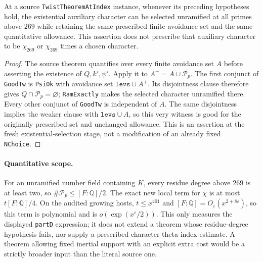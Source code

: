 \begin{proposition}
\label{AC-G40-avoidance}
At a source \texttt{TwistTheoremAtIndex} instance,
whenever its preceding hypotheses hold, the
existential auxiliary character can be selected
unramified at all primes above $269$ while retaining
the same prescribed finite avoidance set and the
same quantitative allowance.  This assertion
does not prescribe that auxiliary character to
be $\chi_{269}$ or $\chi_{269}$ times a chosen character.
\end{proposition}
\begin{proof}
The source theorem quantifies over every finite
avoidance set $A$ before asserting the existence
of $Q,k',\psi'$.  Apply it to
$A^+=A\cup\mathcal P_p$.  The first conjunct of
\texttt{GoodTw} is \texttt{PsiOk} with avoidance set
$\texttt{levs}\cup A^+$.  Its disjointness clause
therefore gives $Q\cap\mathcal P_p=\varnothing$;
\texttt{RamExactly} makes the selected character
unramified there.  Every other conjunct of
\texttt{GoodTw} is independent of $A$.
The same disjointness implies the weaker clause
with $\texttt{levs}\cup A$, so this very witness
is good for the originally prescribed set and
unchanged allowance.  This is an assertion at
the fresh existential-selection stage, not a
modification of an already fixed \texttt{NChoice}.
\end{proof}

\paragraph{Quantitative scope.}
For an unramified number field containing $K$,
every residue degree above $269$ is at least two,
so $\#\mathcal P_p\leq[F:\mathbb Q]/2$.
The exact new local term for $\chi$ is at most
$t[F:\mathbb Q]/4$.  On the audited growing hosts,
$t\leq x^{401}$ and
$[F:\mathbb Q]=O_\varepsilon(x^{2+8\varepsilon})$,
so this term is polynomial and is
$o(\exp(x^\varepsilon/2))$.  This only measures the
displayed \texttt{partD} expression; it does not
extend a theorem whose residue-degree hypothesis
fails, nor supply a prescribed-character theta
index estimate.  A theorem allowing fixed inertial
support with an explicit extra cost would be a
strictly broader input than the literal source one.

